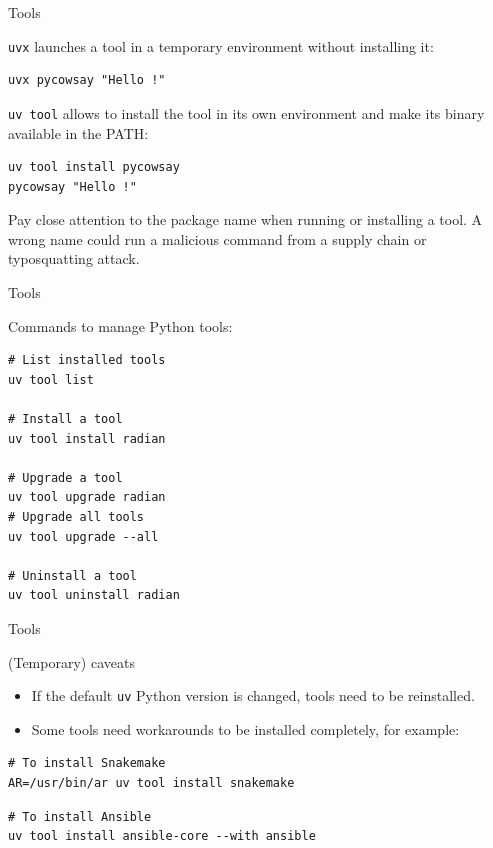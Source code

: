 \documentclass[aspectratio=169,xcolor=dvipsnames,svgnames,x11names,fleqn]{beamer}
\begin{document}
\begin{frame}[containsverbatim]{Tools}

    \texttt{uvx} launches a tool in a temporary environment without installing it:
    \begin{verbatim}
uvx pycowsay "Hello !"
    \end{verbatim}

    \bigskip
    \texttt{uv tool} allows to install the tool in its own environment and make its binary available in the PATH:
    \begin{verbatim}
uv tool install pycowsay
pycowsay "Hello !"
    \end{verbatim}

    \begin{talert}{}
    Pay close attention to the package name when running or installing a tool. A wrong name could run a malicious command from a supply chain or typosquatting attack.
    \end{talert}

\end{frame}

\begin{frame}[containsverbatim]{Tools}

    Commands to manage Python tools:
    \begin{verbatim}
# List installed tools
uv tool list

# Install a tool
uv tool install radian

# Upgrade a tool
uv tool upgrade radian
# Upgrade all tools
uv tool upgrade --all

# Uninstall a tool
uv tool uninstall radian
    \end{verbatim}

\end{frame}

\begin{frame}[containsverbatim]{Tools}

    (Temporary) caveats
    \begin{itemize}
        \item If the default \texttt{uv} Python version is changed, tools need to be reinstalled.
        \item Some tools need workarounds to be installed completely, for example:
    \end{itemize}

    \begin{verbatim}
# To install Snakemake
AR=/usr/bin/ar uv tool install snakemake
    \end{verbatim}

    \begin{verbatim}
# To install Ansible
uv tool install ansible-core --with ansible
    \end{verbatim}

\end{frame}
\end{document}
